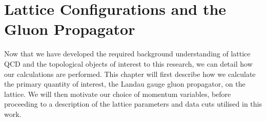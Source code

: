 
\chapter{Lattice Configurations and the Gluon Propagator}\label{chapter:GluonPropagator}
\ifpdf
    \graphicspath{{Chapter4/Figs/Raster/}{Chapter4/Figs/PDF/}{Chapter4/Figs/}}
\else
    \graphicspath{{Chapter4/Figs/Vector/}{Chapter4/Figs/}}
\fi

Now that we have developed the required background understanding of lattice QCD and the topological objects of interest to this research, we can detail how our calculations are performed. This chapter will first describe how we calculate the primary quantity of interest, the Landau gauge gluon propagator, on the lattice. We will then motivate our choice of momentum variables, before proceeding to a description of the lattice parameters and data cuts utilised in this work.

